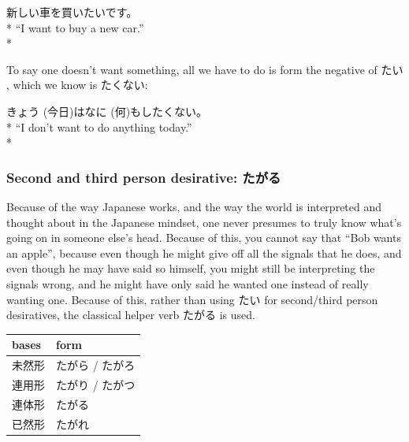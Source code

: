 \documentclass[11pt, b5paper, twoside, openright, onecolumn]{book}
\makeatletter
\newcommand*{\rubystack}[2]{{\relscale{0.5}%
  \begin{tabular}[b]{@{}c@{}}%
    {#1}\\%
   {\textscale{2}{#2}}%
  \end{tabular}}%
}
\DeclareRobustCommand*{\ruby}[2]{%
  \mbox{%
    \setlength{\parskip}{0ex}%
    \BeginAccSupp{method=pdfstringdef,ActualText={#1}}%
      \rubystack{\phantom{#2}}{#1}%
      \llap{%
        \rubystack{#2}{\phantom{#1}}%
      }%
    \EndAccSupp{}%
  }%
}
\renewcommand*{\ruby}[2]{#2 (#1)}%
\newenvironment{exampleblock}{
\setlength{\parindent}{0.6in}
\begin{minipage}[t]{\dimexpr\textwidth-\parindent}}
{\end{minipage}}
\newenvironment{mytabular}[1]{\noindent\hspace{0.4in}
\begin{tabular}[h]{#1}}{\end{tabular}}
\makeatother
\begin{document}
\vspace{0.4cm}
\begin{exampleblock}
新しい車を買いたいです。 \\* 
“I want to buy a new car.” \\* 
\end{exampleblock}
\vspace{0.2cm}

To say one doesn’t want something‚ all we have to do is form the negative of たい‚ which we know is たくない:

\vspace{0.4cm}
\begin{exampleblock}
\ruby{今日}{きょう}は\ruby{何}{なに}もしたくない。 \\* 
“I don’t want to do anything today.” \\* 
\end{exampleblock}
\subsubsection{Second and third person desirative: たがる}


Because of the way Japanese works‚ and the way the world is interpreted and thought about in the Japanese mindset‚ one never presumes to truly know what’s going on in someone else’s head. Because of this‚ you cannot say that “Bob wants an apple”‚ because even though he might give off all the signals that he does‚ and even though he may have said so himself‚ you might still be interpreting the signals wrong‚ and he might have only said he wanted one instead of really wanting one. Because of this‚ rather than using たい for second/third person desiratives‚ the classical helper verb たがる is used.

\vspace{0.5cm}
\smaller
\begin{mytabular}{| l  l |}\hline 
\rule{0pt}{2.4ex}bases & form\\ 
\hline
\rule{0pt}{2.4ex}未然形 & たがら / たがろ\\ 
\rule{0pt}{2.4ex}連用形 & たがり / たがつ\\ 
\rule{0pt}{2.4ex}連体形 & たがる\\ 
\rule{0pt}{2.4ex}已然形 & たがれ\\ 
\hline 
\end{mytabular}
\larger
\vspace{0.5cm}
\end{document}
